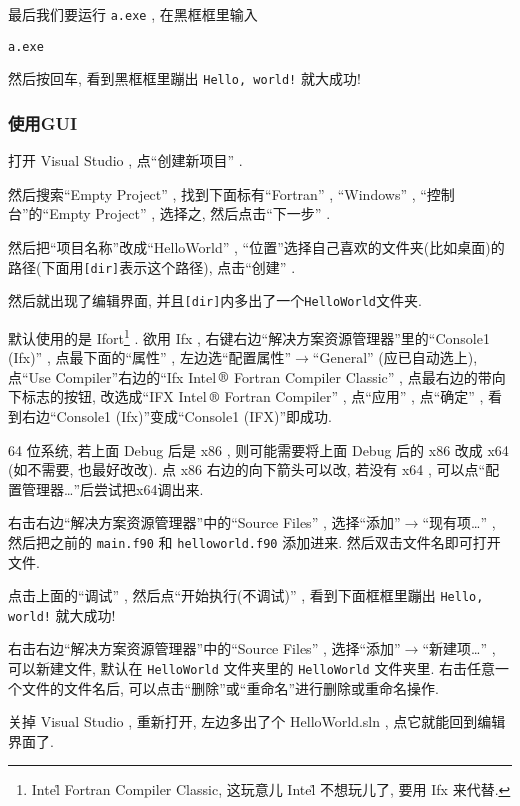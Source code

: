 最后我们要运行 \texttt{a.exe} , 在黑框框里输入
\begin{verbatim}
a.exe
\end{verbatim}
然后按回车, 看到黑框框里蹦出 \texttt{Hello, world!} 就大成功!

\subsubsection{使用GUI}

打开 Visual Studio , 点``创建新项目'' .

然后搜索``Empty Project'' , 找到下面标有``Fortran'' , ``Windows'' , ``控制台''的``Empty Project'' , 选择之, 然后点击``下一步'' .

然后把``项目名称''改成``HelloWorld'' , ``位置''选择自己喜欢的文件夹(比如桌面)的路径(下面用\texttt{[dir]}表示这个路径), 点击``创建'' .

然后就出现了编辑界面, 并且\texttt{[dir]}内多出了一个\texttt{HelloWorld}文件夹.

默认使用的是 Ifort\footnote{Intel\r{} Fortran Compiler Classic, 这玩意儿 Intel\r{} 不想玩儿了, 要用 Ifx 来代替.} . 欲用 Ifx , 右键右边``解决方案资源管理器''里的``Console1 (Ifx)'' , 点最下面的``属性'' , 左边选``配置属性''$\rightarrow$``General'' (应已自动选上), 点``Use Compiler''右边的``Ifx Intel$\,\text{\textregistered}$ Fortran Compiler Classic'' , 点最右边的带向下标志的按钮, 改选成``IFX Intel$\,\text{\textregistered}$ Fortran Compiler'' , 点``应用'' , 点``确定'' , 看到右边``Console1 (Ifx)''变成``Console1 (IFX)''即成功.

64 位系统, 若上面 Debug 后是 x86 , 则可能需要将上面 Debug 后的 x86 改成 x64 (如不需要, 也最好改改). 点 x86 右边的向下箭头可以改, 若没有 x64 , 可以点``配置管理器\dots''后尝试把x64调出来.

右击右边``解决方案资源管理器''中的``Source Files'' , 选择``添加''$\rightarrow$``现有项\dots'' , 然后把之前的 \texttt{main.f90} 和 \texttt{helloworld.f90} 添加进来. 然后双击文件名即可打开文件.

点击上面的``调试'' , 然后点``开始执行(不调试)'' , 看到下面框框里蹦出 \texttt{Hello, world!} 就大成功!

右击右边``解决方案资源管理器''中的``Source Files'' , 选择``添加''$\rightarrow$``新建项\dots'' , 可以新建文件, 默认在 \texttt{HelloWorld} 文件夹里的 \texttt{HelloWorld} 文件夹里. 右击任意一个文件的文件名后, 可以点击``删除''或``重命名''进行删除或重命名操作.

关掉 Visual Studio , 重新打开, 左边多出了个 HelloWorld.sln , 点它就能回到编辑界面了.

